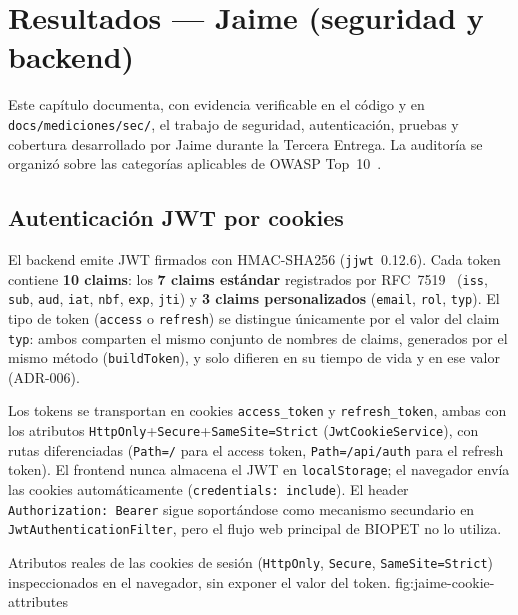 \chapter{Resultados --- Jaime (seguridad y backend)}
\label{cap:resultados-jaime}

Este cap\'itulo documenta, con evidencia verificable en el c\'odigo y en
\texttt{docs/mediciones/sec/}, el trabajo de seguridad, autenticaci\'on,
pruebas y cobertura desarrollado por Jaime durante la Tercera Entrega. La
auditor\'ia se organiz\'o sobre las categor\'ias aplicables de OWASP Top~10~\cite{owasp-top10}.

\section{Autenticaci\'on JWT por cookies}

El backend emite JWT firmados con HMAC-SHA256 (\texttt{jjwt}~0.12.6). Cada
token contiene \textbf{10 claims}: los \textbf{7 claims est\'andar}
registrados por RFC~7519~\cite{rfc7519} (\texttt{iss}, \texttt{sub}, \texttt{aud},
\texttt{iat}, \texttt{nbf}, \texttt{exp}, \texttt{jti}) y \textbf{3 claims
personalizados} (\texttt{email}, \texttt{rol}, \texttt{typ}). El tipo de
token (\texttt{access} o \texttt{refresh}) se distingue \'unicamente por el
valor del claim \texttt{typ}: ambos comparten el mismo conjunto de nombres
de claims, generados por el mismo m\'etodo (\texttt{buildToken}), y solo
difieren en su tiempo de vida y en ese valor (ADR-006).

Los tokens se transportan en cookies \texttt{access_token} y
\texttt{refresh_token}, ambas con los atributos
\texttt{HttpOnly}+\texttt{Secure}+\texttt{SameSite=Strict}
(\texttt{JwtCookieService}), con rutas diferenciadas
(\texttt{Path=/} para el access token, \texttt{Path=/api/auth} para el
refresh token). El frontend nunca almacena el JWT en \texttt{localStorage};
el navegador env\'ia las cookies autom\'aticamente
(\texttt{credentials: include}). El header \texttt{Authorization: Bearer}
sigue soport\'andose como mecanismo secundario en
\texttt{JwtAuthenticationFilter}, pero el flujo web principal de BIOPET no
lo utiliza.

%
{Atributos reales de las cookies de sesi\'on (\texttt{HttpOnly}, \texttt{Secure}, \texttt{SameSite=Strict}) inspeccionados en el navegador, sin exponer el valor del token.}%
{fig:jaime-cookie-attributes}

